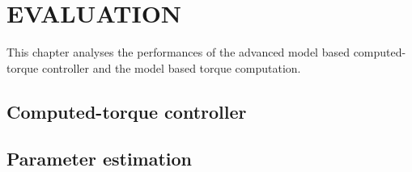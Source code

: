 \chapter{EVALUATION}
\label{sec:evaluation}
This chapter analyses the performances of the advanced model based computed-torque controller and the model based torque computation.

\section{Computed-torque controller}

\section{Parameter estimation}

